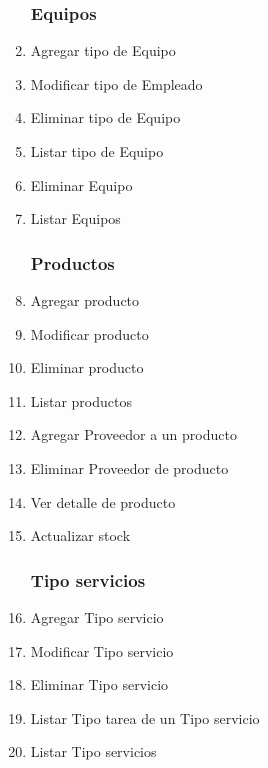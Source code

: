 \documentclass[12pt]{extarticle}
\begin{document}
\begin{spacing}{1.2}
\begin{multicols}{2}
\begin{enumerate}
        \subsubsection*{Equipos}
            \item Agregar tipo de Equipo
            \item Modificar tipo de Empleado
            \item Eliminar tipo de Equipo
            \item Listar tipo de Equipo
            \item Eliminar Equipo
            \item Listar Equipos
        \subsubsection*{Productos}
            \item Agregar producto
            \item Modificar producto
            \item Eliminar producto
            \item Listar productos
            \item Agregar Proveedor a un producto
            \item Eliminar Proveedor de producto
            \item Ver detalle de producto
            \item Actualizar stock
        \subsubsection*{Tipo servicios}
            \item Agregar Tipo servicio
            \item Modificar Tipo servicio
            \item Eliminar Tipo servicio
            \item Listar Tipo tarea de un Tipo servicio
            \item Listar Tipo servicios

\end{enumerate}
\end{multicols}
\end{spacing}
\end{document}
